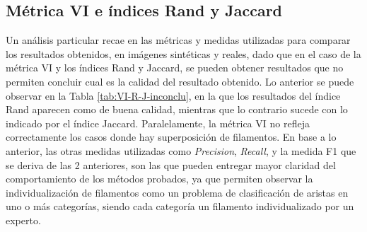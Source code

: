 \subsection{M\'etrica VI e \'indices Rand y Jaccard}

Un an\'alisis particular recae en las m\'etricas y medidas utilizadas para comparar los resultados obtenidos, en im\'agenes sint\'eticas y reales, dado que en el caso de la m\'etrica VI y los \'indices Rand y Jaccard, se pueden obtener resultados que no permiten concluir cual es la calidad del resultado obtenido. Lo anterior se puede observar en la Tabla \ref{tab:VI-R-J-inconclu}, en la que los resultados del \'indice Rand aparecen como de buena calidad, mientras que lo contrario sucede con lo indicado por el \'indice Jaccard. Paralelamente, la m\'etrica VI no refleja correctamente los casos donde hay superposici\'on de filamentos. En base a lo anterior, las otras medidas utilizadas como {\it Precision}, {\it Recall}, y la medida F1 que se deriva de las 2 anteriores, son las que pueden entregar mayor claridad del comportamiento de los m\'etodos probados, ya que permiten observar la individualizaci\'on de filamentos como un problema de clasificaci\'on de aristas en uno o m\'as categor\'ias, siendo cada  categor\'ia un filamento individualizado por un experto.


